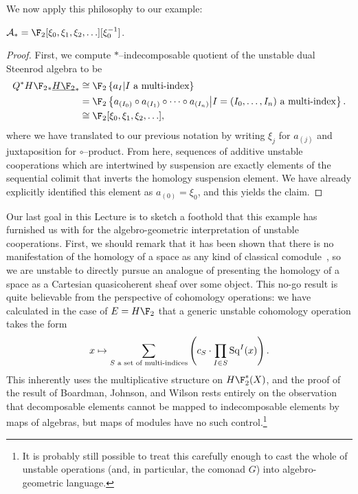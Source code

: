 We now apply this philosophy to our example:
\begin{corollary}\label{StarIndecompsInUDualSteenrodAlg}
$\mathcal A_* = \F_2[\xi_0, \xi_1, \xi_2, \ldots][\xi_0^{-1}]$.
\end{corollary}
\begin{proof}
First, we compute $\ast$--indecomposable quotient of the unstable dual Steenrod algebra to be
\begin{align*}
Q^\ast H\F_2{}_* \OS{H\F_2}{*} & \cong \F_2\left\{a_{I} \middle| \text{$I$ a multi-index}\right\} \\
& = \F_2\left\{ a_{(I_0)} \circ a_{(I_1)} \circ \cdots \circ a_{(I_n)} \middle| \text{$I = (I_0, \ldots, I_n)$ a multi-index}\right\}. \\
& \cong \F_2[\xi_0, \xi_1, \xi_2, \ldots],
\end{align*}
where we have translated to our previous notation by writing $\xi_j$ for $a_{(j)}$ and juxtaposition for $\circ$--product.  From here, sequences of additive unstable cooperations which are intertwined by suspension are exactly elements of the sequential colimit that inverts the homology suspension element.  We have already explicitly identified this element as $a_{(0)} = \xi_0$, and this yields the claim.
\end{proof}

Our last goal in this Lecture is to sketch a foothold that this example has furnished us with for the algebro-geometric interpretation of unstable cooperations.  First, we should remark that it has been shown that there is no manifestation of the homology of a space as any kind of classical comodule~\cite[Theorem 9.4]{BJW}, so we are unstable to directly pursue an analogue of  presenting the homology of a space as a Cartesian quasicoherent sheaf over some object.  This no-go result is quite believable from the perspective of cohomology operations: we have calculated in the case of $E = H\F_2$ that a generic unstable cohomology operation takes the form \[x \mapsto \sum_{\text{$S$ a set of multi-indices}} \left(c_S \cdot \prod_{I \in S} \operatorname{Sq}^I(x)\right).\]  This inherently uses the multiplicative structure on $H\F_2^*(X)$, and the proof of the result of Boardman, Johnson, and Wilson rests entirely on the observation that decomposable elements cannot be mapped to indecomposable elements by maps of algebras, but maps of modules have no such control.\footnote{It is probably still possible to treat this carefully enough to cast the whole of unstable operations (and, in particular, the comonad $G$) into algebro-geometric language.}

